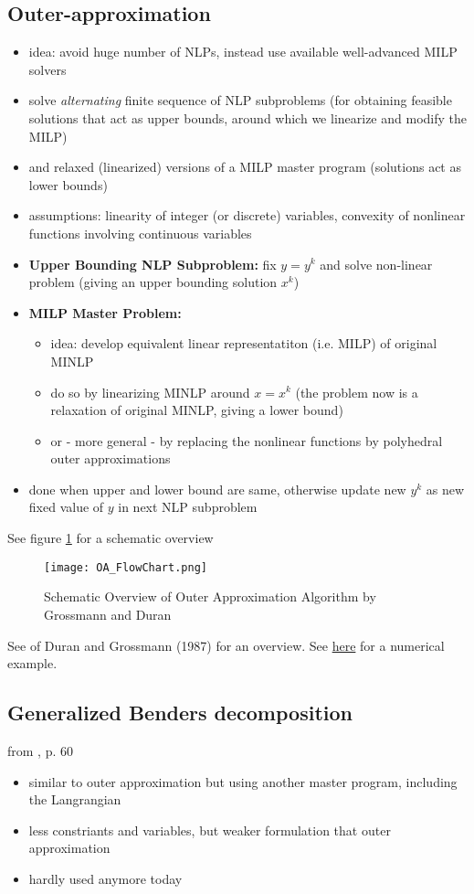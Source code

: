 \documentclass{article}
\begin{document}
\subsection{Outer-approximation}
\begin{itemize}
\item idea: avoid huge number of NLPs, instead use available well-advanced MILP solvers
\item solve \emph{alternating} finite sequence of NLP subproblems (for obtaining feasible solutions that act as upper bounds, around which we linearize and modify the MILP)
\item and relaxed (linearized) versions of a MILP master program (solutions act as lower bounds)
\item assumptions: linearity of integer (or discrete) variables, convexity of nonlinear functions involving continuous variables
\item \textbf{Upper Bounding NLP Subproblem:} fix $y=y^k$ and solve non-linear problem (giving an upper bounding solution $x^k$)
\item \textbf{MILP Master Problem:} 
	\begin{itemize}
	\item idea: develop equivalent linear representatiton (i.e. MILP) of original MINLP
	\item do so by linearizing MINLP around $x=x^k$ (the problem now is a relaxation of original MINLP, giving a lower bound)
	\item or - more general - by replacing the nonlinear functions by polyhedral outer approximations
	\end{itemize}
\item done when upper and lower bound are same, otherwise update new $y^k$ as new fixed value of $y$ in next NLP subproblem
\end{itemize}
See figure \ref{fig:OA_FlowChart} for a schematic overview

\begin{figure}[htb]
\centering
\texttt{[image: OA\_FlowChart.png]}
\caption{Schematic Overview of Outer Approximation Algorithm by Grossmann and Duran}
\label{fig:OA_FlowChart}
\end{figure}

\noindent
See \cite{duran1986outer} of Duran and Grossmann (1987) for an overview. See \href{https://optimization.mccormick.northwestern.edu/index.php/Outer-approximation_(OA)}{here} for a numerical example.

\subsection{Generalized Benders decomposition}
from \cite{sager2005numerical}, p. 60
\begin{itemize}
\item similar to outer approximation but using another master program, including the Langrangian
\item less constriants and variables, but weaker formulation that outer approximation
\item hardly used anymore today
\end{itemize}
\end{document}
